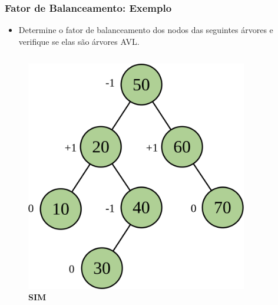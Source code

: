 \documentclass[aspectratio=169]{beamer}
\begin{document}
\begin{frame}\frametitle{Fator de Balanceamento: Exemplo}
\begin{itemize}
	\item Determine o fator de balanceamento dos nodos das seguintes árvores e verifique se elas são árvores AVL.
\end{itemize}
\vspace{-3mm}
\begin{columns}[T]
\begin{column}{0.5\linewidth}
\begin{figure}[h]
	\centering
	\includegraphics[height=0.5\paperheight]{imagens/avl07c.png}\\
	\textbf{SIM}
\end{figure}
\end{column}
\begin{column}{0.5\linewidth}
\begin{figure}[h]
	\centering

\end{figure}
\end{column}
\end{columns}
\end{frame}
\end{document}
